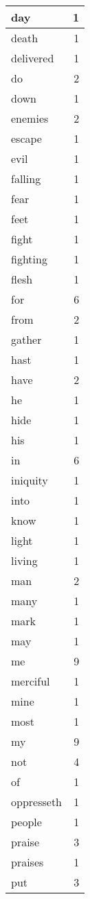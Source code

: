 \begin{center}
\begin{longtable}{l|r}
day & 1 \\ \hline
death & 1 \\ \hline
delivered & 1 \\ \hline
do & 2 \\ \hline
down & 1 \\ \hline
enemies & 2 \\ \hline
escape & 1 \\ \hline
evil & 1 \\ \hline
falling & 1 \\ \hline
fear & 1 \\ \hline
feet & 1 \\ \hline
fight & 1 \\ \hline
fighting & 1 \\ \hline
flesh & 1 \\ \hline
for & 6 \\ \hline
from & 2 \\ \hline
gather & 1 \\ \hline
hast & 1 \\ \hline
have & 2 \\ \hline
he & 1 \\ \hline
hide & 1 \\ \hline
his & 1 \\ \hline
in & 6 \\ \hline
iniquity & 1 \\ \hline
into & 1 \\ \hline
know & 1 \\ \hline
light & 1 \\ \hline
living & 1 \\ \hline
man & 2 \\ \hline
many & 1 \\ \hline
mark & 1 \\ \hline
may & 1 \\ \hline
me & 9 \\ \hline
merciful & 1 \\ \hline
mine & 1 \\ \hline
most & 1 \\ \hline
my & 9 \\ \hline
not & 4 \\ \hline
of & 1 \\ \hline
oppresseth & 1 \\ \hline
people & 1 \\ \hline
praise & 3 \\ \hline
praises & 1 \\ \hline
put & 3 \\ \hline

\end{longtable}
\end{center}
